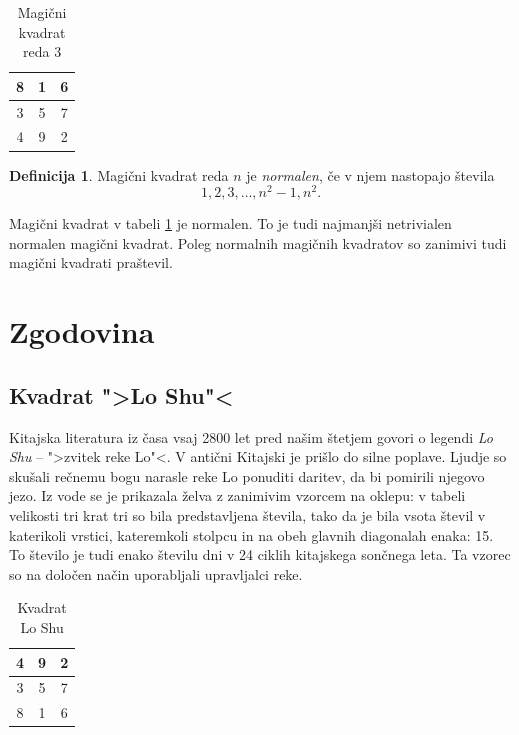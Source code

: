 \documentclass[12pt]{article}
\newcommand{\pojem}[1]{\emph{\color{purple}#1}}
\newenvironment{magic}[3]{
\begin{table}[!ht]
   \centering
   \caption{#2}
   \label{#3}
   \large
   \begin{tabular}{|*{#1}{c|}}\hline
}{
   \end{tabular}
   \normalsize
\end{table}
}
\theoremstyle{definition}
\newtheorem{definicija}{Definicija}
\theoremstyle{plain}
\begin{document}
\begin{magic}{3}{Magični kvadrat reda 3}{table:mag3}
   8 & 1 & 6 \\\hline
   3 & 5 & 7 \\\hline
   4 & 9 & 2 \\\hline
\end{magic}

\begin{definicija}
   Magični kvadrat reda $n$ je \pojem{normalen}, če v njem nastopajo števila
   \begin{equation}
      1, 2, 3, \ldots, n^2-1, n^2. 
   \label{eq:numbers}
   \end{equation}
\end{definicija}

Magični kvadrat v tabeli \ref{table:mag3} je normalen.
To je tudi najmanjši netrivialen normalen magični kvadrat.
Poleg normalnih magičnih kvadratov so zanimivi tudi magični kvadrati praštevil.


\section{Zgodovina}

\subsection{Kvadrat ">Lo Shu"<}

Kitajska literatura iz časa vsaj 2800 let pred našim štetjem govori o legendi
\pojem{Lo Shu} -- ">zvitek reke Lo"<. V antični Kitajski je prišlo do
silne poplave. Ljudje so skušali rečnemu bogu narasle reke Lo ponuditi daritev,
da bi pomirili njegovo jezo. Iz vode se je prikazala želva z zanimivim vzorcem
na oklepu: v tabeli velikosti tri krat tri so bila predstavljena števila, tako
da je bila vsota števil v katerikoli vrstici, kateremkoli stolpcu in na obeh
glavnih diagonalah enaka: 15. To število je tudi enako številu dni v 24 ciklih
kitajskega sončnega leta. Ta vzorec so na določen način uporabljali upravljalci
reke.

\begin{magic}{3}{Kvadrat Lo Shu}{loshu}
   4 & 9 & 2 \\\hline
   3 & 5 & 7 \\\hline
   8 & 1 & 6 \\\hline
\end{magic}
\end{document}
